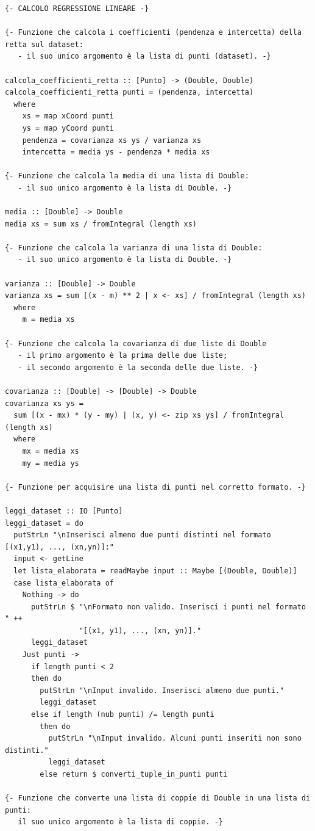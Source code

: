 \documentclass[11pt]{article}
\theoremstyle{definition}
\begin{document}
\begin{verbatim}
{- CALCOLO REGRESSIONE LINEARE -}

{- Funzione che calcola i coefficienti (pendenza e intercetta) della retta sul dataset: 
   - il suo unico argomento è la lista di punti (dataset). -}
   
calcola_coefficienti_retta :: [Punto] -> (Double, Double)
calcola_coefficienti_retta punti = (pendenza, intercetta)
  where
    xs = map xCoord punti
    ys = map yCoord punti
    pendenza = covarianza xs ys / varianza xs
    intercetta = media ys - pendenza * media xs

{- Funzione che calcola la media di una lista di Double:
   - il suo unico argomento è la lista di Double. -}
   
media :: [Double] -> Double
media xs = sum xs / fromIntegral (length xs)

{- Funzione che calcola la varianza di una lista di Double:
   - il suo unico argomento è la lista di Double. -}

varianza :: [Double] -> Double
varianza xs = sum [(x - m) ** 2 | x <- xs] / fromIntegral (length xs)
  where
    m = media xs

{- Funzione che calcola la covarianza di due liste di Double
   - il primo argomento è la prima delle due liste;
   - il secondo argomento è la seconda delle due liste. -}

covarianza :: [Double] -> [Double] -> Double
covarianza xs ys = 
  sum [(x - mx) * (y - my) | (x, y) <- zip xs ys] / fromIntegral (length xs)
  where
    mx = media xs
    my = media ys

{- Funzione per acquisire una lista di punti nel corretto formato. -}

leggi_dataset :: IO [Punto]
leggi_dataset = do
  putStrLn "\nInserisci almeno due punti distinti nel formato [(x1,y1), ..., (xn,yn)]:"
  input <- getLine
  let lista_elaborata = readMaybe input :: Maybe [(Double, Double)]
  case lista_elaborata of
    Nothing -> do
      putStrLn $ "\nFormato non valido. Inserisci i punti nel formato " ++
                 "[(x1, y1), ..., (xn, yn)]."
      leggi_dataset
    Just punti -> 
      if length punti < 2 
      then do
        putStrLn "\nInput invalido. Inserisci almeno due punti."
        leggi_dataset
      else if length (nub punti) /= length punti
        then do
          putStrLn "\nInput invalido. Alcuni punti inseriti non sono distinti."
          leggi_dataset
        else return $ converti_tuple_in_punti punti

{- Funzione che converte una lista di coppie di Double in una lista di punti:
   il suo unico argomento è la lista di coppie. -}


\end{verbatim}
\end{document}
